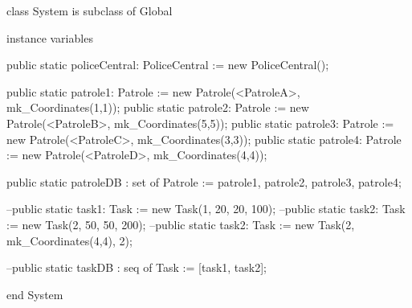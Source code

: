 \documentclass[a4paper]{article}
\begin{document}
\title{}
\author{}
\begin{vdm_al}
class System is subclass of Global

instance variables

    public static policeCentral: PoliceCentral := new PoliceCentral();

    public static patrole1: Patrole := new Patrole(<PatroleA>, mk_Coordinates(1,1));
    public static patrole2: Patrole := new Patrole(<PatroleB>, mk_Coordinates(5,5));
    public static patrole3: Patrole := new Patrole(<PatroleC>, mk_Coordinates(3,3));
    public static patrole4: Patrole := new Patrole(<PatroleD>, mk_Coordinates(4,4));

    public static patroleDB : set of Patrole := {patrole1, patrole2, patrole3, patrole4};

    --public static task1: Task := new Task(1, 20, 20, 100);
    --public static task2: Task := new Task(2, 50, 50, 200);
    --public static task2: Task := new Task(2, mk_Coordinates(4,4), 2);
    
    --public static taskDB : seq of Task := [task1, task2];

end System
\end{vdm_al}
\end{document}
